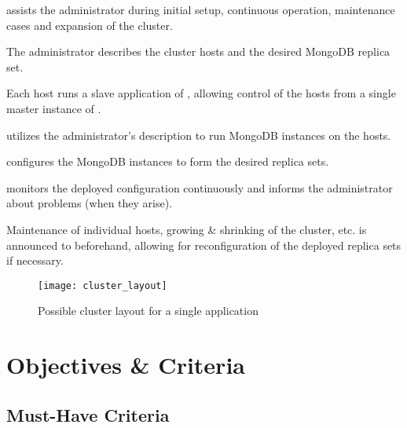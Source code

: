 \documentclass[a4paper, 11pt]{article}
\begin{document}
\mamid assists the \gls{administrator} during initial setup, continuous operation, maintenance cases and expansion of the cluster.

The \gls{administrator} describes the \gls{cluster} \glspl{host} and the desired \gls{MongoDB} \gls{replica set}.

Each \gls{host} runs a \gls{slave} application of \mamid, allowing control of the \glspl{host} from a single \gls{master} instance of \mamid.

\mamid utilizes the \gls{administrator}'s description to run \gls{MongoDB} instances on the \glspl{host}.

\mamid configures the \gls{MongoDB} instances to form the desired replica sets.

\mamid monitors the deployed configuration continuously and informs the \gls{administrator} about problems (when they arise).

Maintenance of individual \glspl{host}, growing \& shrinking of the cluster, etc. is announced to \mamid beforehand, allowing for reconfiguration of the deployed \glspl{replica set} if necessary.

\begin{figure}[H]
	\centering
	\texttt{[image: cluster\_layout]}
	\caption{Possible cluster layout for a single application}
\end{figure}

\section{Objectives \& Criteria}
\subsection{Must-Have Criteria}
\end{document}
